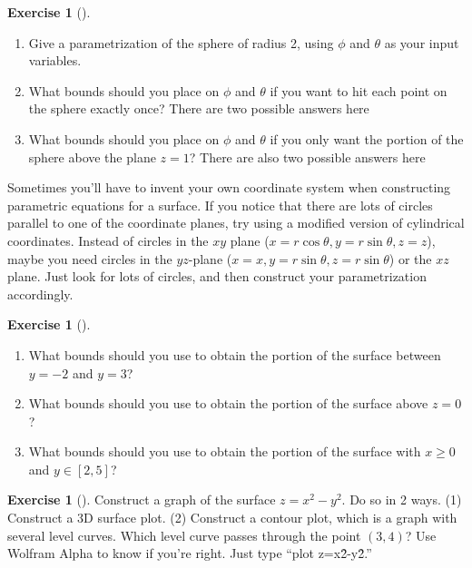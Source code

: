 \documentclass[10pt,]{book}
\theoremstyle{plain}
\theoremstyle{definition}
\theoremstyle{definition}
\theoremstyle{definition}
\theoremstyle{definition}
\newtheorem{exploration}[project]{Exercise}
\theoremstyle{definition}
\numberwithin{equation}{section}
\begin{document}
\begin{exploration}[]\label{exploration-127}
\leavevmode%
\begin{enumerate}[font=\bfseries,label=(\alph*),ref=\alph*]
\item\label{task-252} Give a parametrization of the sphere of radius 2, using \(\phi\) and \(\theta\) as your input variables.%
\item\label{task-253} What bounds should you place on \(\phi\) and \(\theta\) if you want to hit each point on the sphere exactly once? There are two possible answers here%
%
\item\label{task-254} What bounds should you place on \(\phi\) and \(\theta\) if you only want the portion of the sphere above the plane \(z=1\)? There are also two possible answers here%
%
\end{enumerate}
\end{exploration}
Sometimes you'll have to invent your own coordinate system when constructing parametric equations for a surface. If you notice that there are lots of circles parallel to one of the coordinate planes, try using a modified version of cylindrical coordinates. Instead of circles in the \(xy\) plane (\(x=r\cos\theta,y=r\sin\theta,z=z\)), maybe you need circles in the \(yz\)-plane (\(x=x,y=r\sin\theta,z=r\sin\theta\)) or the \(xz\) plane. Just look for lots of circles, and then construct your parametrization accordingly.%
\begin{exploration}[]\label{exploration-128}
\leavevmode%
\begin{enumerate}[font=\bfseries,label=(\alph*),ref=\alph*]
\item\label{task-255} What bounds should you use to obtain the portion of the surface between \(y=-2\) and \(y=3\)?%
\item\label{task-256} What bounds should you use to obtain the portion of the surface above \(z=0\)?%
\item\label{task-257} What bounds should you use to obtain the portion of the surface with \(x\geq 0\) and \(y\in[2,5]\)?%
\end{enumerate}
\end{exploration}
\begin{exploration}[]\label{exploration-129}
Construct a graph of the surface \(z = x^2-y^2\). Do so in 2 ways. (1) Construct a 3D surface plot. (2) Construct a contour plot, which is a graph with several level curves. Which level curve passes through the point \((3,4)\)? Use Wolfram Alpha to know if you're right. Just type ``plot z=x\^2-y\^2.''%
\end{exploration}
\end{document}
